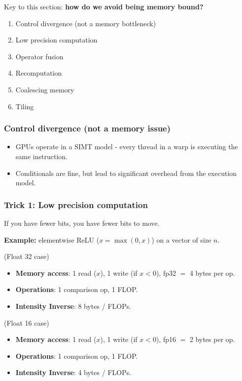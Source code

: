 \documentclass[12pt,twoside]{article}
\begin{document}
Key to this section: \textbf{how do we avoid being memory bound?}

\begin{enumerate}
    \item Control divergence (not a memory bottleneck)
    \item Low precision computation
    \item Operator fusion
    \item Recomputation
    \item Coalescing memory
    \item Tiling
\end{enumerate}

\subsubsection*{Control divergence (not a memory issue)}

\begin{itemize}
    \item GPUs operate in a SIMT model - every thread in a warp is executing the same instruction.
    \item Conditionals are fine, but lead to significant overhead from the execution model. 
\end{itemize}

\subsubsection*{Trick 1: Low precision computation}

If you have fewer bits, you have fewer bits to move.

\begin{center}
    \textbf{Example:} elementwise ReLU (\(x = \max(0, x)\)) on a vector of size \(n\).
\end{center}

(Float 32 case)
\begin{itemize}
    \item \textbf{Memory access}: 1 read (\(x\)), 1 write (if \(x < 0\)), fp32 \(=\) 4 bytes per op.
    \item \textbf{Operations}: 1 comparison op, 1 FLOP.
    \item \textbf{Intensity Inverse}: 8 bytes / FLOPs.
\end{itemize}

(Float 16 case)
\begin{itemize}
    \item \textbf{Memory access}: 1 read (\(x\)), 1 write (if \(x < 0\)), fp16 \(=\) 2 bytes per op.
    \item \textbf{Operations}: 1 comparison op, 1 FLOP.
    \item \textbf{Intensity Inverse}: 4 bytes / FLOPs.
\end{itemize}
\end{document}
